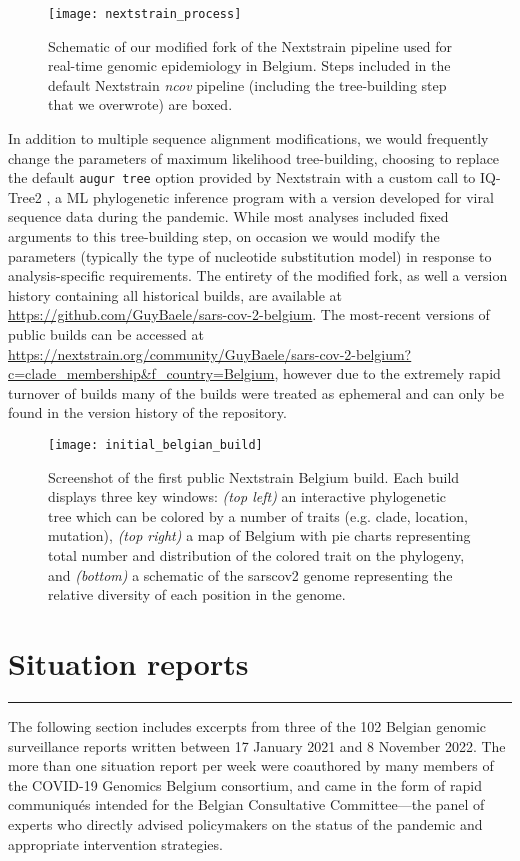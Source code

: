 \begin{figure}[ht]
  \centering
  \texttt{[image: nextstrain\_process]}
  \caption[Modified Nextstrain pipeline]{Schematic of our modified fork of the Nextstrain pipeline used for real-time genomic epidemiology in Belgium. Steps included in the default Nextstrain \textit{ncov} pipeline (including the tree-building step that we overwrote) are boxed.}
  \label{fig:beNxt}
\end{figure}

In addition to multiple sequence alignment modifications, we would frequently change the parameters of maximum likelihood tree-building, choosing to replace the default \verb|augur tree| option provided by Nextstrain with a custom call to IQ-Tree2 \citep{minh2020iq}, a ML phylogenetic inference program with a version developed for viral sequence data during the pandemic.
While most analyses included fixed arguments to this tree-building step, on occasion we would modify the parameters (typically the type of nucleotide substitution model) in response to analysis-specific requirements.
The entirety of the modified fork, as well a version history containing all historical builds, are available at \url{https://github.com/GuyBaele/sars-cov-2-belgium}.
The most-recent versions of public builds can be accessed at \url{https://nextstrain.org/community/GuyBaele/sars-cov-2-belgium?c=clade_membership&f_country=Belgium}, however due to the extremely rapid turnover of builds many of the builds were treated as ephemeral and can only be found in the version history of the repository.

\begin{figure}[ht]
  \centering
  \texttt{[image: initial\_belgian\_build]}
  \caption[First Belgian Nextstrain instance]{Screenshot of the first public Nextstrain Belgium build. Each build displays three key windows: \textit{(top left)} an interactive phylogenetic tree which can be colored by a number of traits (e.g. clade, location, mutation), \textit{(top right)} a map of Belgium with pie charts representing total number and distribution of the colored trait on the phylogeny, and \textit{(bottom)} a schematic of the \gls{sarscov2} genome representing the relative diversity of each position in the genome.}
  \label{fig:firstBeBuild}
\end{figure}

\section{Situation reports}\label{sec:sitRep}
\singlespacing
\hrule
\vspace*{12pt}
The following section includes excerpts from three of the 102 Belgian genomic surveillance reports written between 17 January 2021 and 8 November 2022.
The more than one situation report per week were coauthored by many members of the COVID-19 Genomics Belgium consortium, and came in the form of rapid communiqu\'{e}s intended for the Belgian Consultative Committee---the panel of experts who directly advised policymakers on the status of the pandemic and appropriate intervention strategies.

